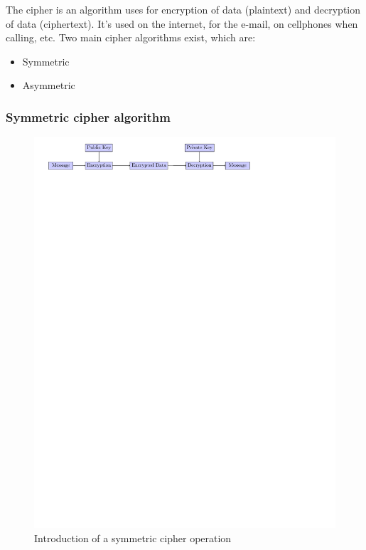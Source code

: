  The cipher is an algorithm uses for encryption of data (plaintext) and
 decryption of data (ciphertext).
 It's used on the internet, for the e-mail, on cellphones when calling, etc.
 Two main cipher algorithms exist, which are:
 \begin{itemize}[noitemsep]
   \item Symmetric
   \item Asymmetric
 \end{itemize}


\subsubsection{Symmetric cipher algorithm}
\label{intro_sym_cipher}

\begin{figure}[!ht]
\centering
\includegraphics[trim=0cm 25.25cm 5cm 0cm]{figures/intro_sym_cipher.pdf}
\caption{Introduction of a symmetric cipher operation}
\label{fig:sym}

\end{figure}

